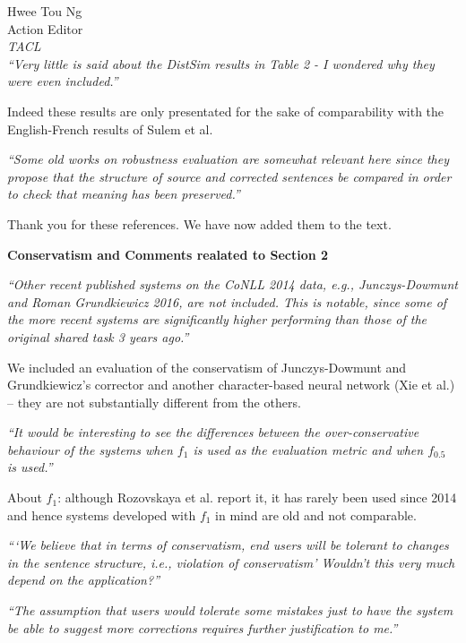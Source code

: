 \documentclass[11pt,letterpaper]{letter}
\begin{document}
\begin{letter}{%
Hwee Tou Ng\\
Action Editor\\
{\em TACL}\\
}
\emph{``Very little is said about the DistSim results in Table 2 - I wondered why
	they were even included.''}
	
Indeed these results are only presentated for the sake of comparability with the English-French results of Sulem et al.
	
\emph{``Some old works on robustness evaluation are somewhat relevant here since
	they propose that the structure of source and corrected sentences be
	compared in order to check that meaning has been preserved.''}
	
Thank you for these references. We have now added them to the text.
	
{\large\bf Conservatism and Comments realated to Section 2}

\emph{``Other recent published systems on the CoNLL 2014 data, e.g., Junczys-Dowmunt
	and Roman Grundkiewicz 2016, are not included. This is notable, since some
	of the more recent systems are significantly higher performing than those of
	the original shared task 3 years ago.''}
	
We included an evaluation of the conservatism of Junczys-Dowmunt and Grundkiewicz's corrector  and another character-based neural network (Xie et al.) -- they are not substantially different from the others.

\emph{``It would be interesting to see the differences between the over-conservative
	behaviour of the systems when $f_1$ is used as the evaluation metric and when
	$f_{0.5}$ is used.''}

About $f_1$: although Rozovskaya et al. report it, it has rarely been used since 2014 and hence systems developed with $f_1$ in mind are old and not comparable.
	
\emph{```We believe that in terms of conservatism, end users will be tolerant to
	changes in the sentence structure, i.e., violation of conservatism' Wouldn't
	this very much depend on the application?''
}

\emph{``The assumption that users would tolerate
	some mistakes just to have the system be able to suggest more corrections
	requires further justification to me.''
}
	

\end{letter}
\end{document}
